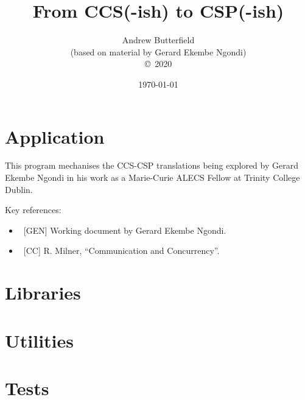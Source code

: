 \documentclass[fleqn,10pt]{report}
\author{
Andrew Butterfield
\\(based on material by Gerard Ekembe Ngondi)
\\
{\small \copyright\ 2020}
}
\title{
  From CCS(-ish) to CSP(-ish)
}
\date{
\today
}
\begin{document}
\maketitle
\tableofcontents


\chapter{Application}

This program mechanises the CCS-CSP translations
being explored by Gerard Ekembe Ngondi
in his work as a Marie-Curie ALECS Fellow at Trinity College Dublin.

Key references:
\begin{itemize}
  \item ~[GEN] Working document by Gerard Ekembe Ngondi.
  \item ~[CC] R. Milner, ``Communication and Concurrency''.
\end{itemize}

\newpage


\chapter{Libraries}

\newpage

\newpage

\newpage


\appendix

\chapter{Utilities}
\newpage



\chapter{Tests}

\newpage


% 



\end{document}

